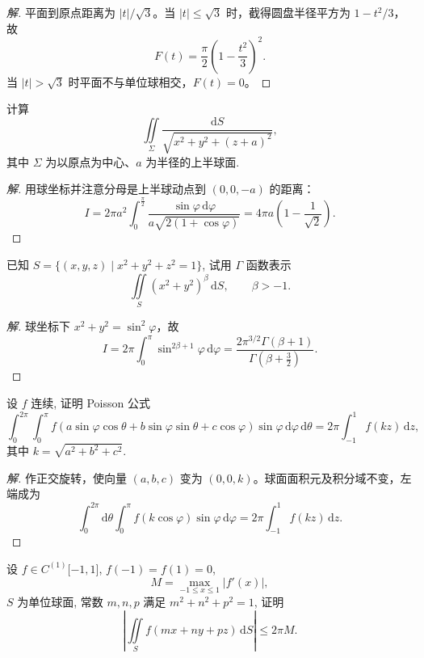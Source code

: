 \documentclass[../../数学分析培优讲义(答案版).tex]{subfiles}
\begin{document}
\begin{proof}[解]
平面到原点距离为 $|t|/\sqrt{3}$。当 $|t|\leq\sqrt{3}$ 时，截得圆盘半径平方为 $1-t^2/3$，故
\[
F(t)=\dfrac{\pi}{2}\left(1-\dfrac{t^2}{3}\right)^2.
\]
当 $|t|>\sqrt{3}$ 时平面不与单位球相交，$F(t)=0$。
\end{proof}

\begin{example}
计算
\[
    \iint\limits_\Sigma\dfrac{\mathrm{d}S}{\sqrt{x^2+y^2+(z+a)^2}},
\]
其中 $\Sigma$ 为以原点为中心、$a$ 为半径的上半球面.
\end{example}

\begin{proof}[解]
用球坐标并注意分母是上半球动点到 $(0,0,-a)$ 的距离：
\[
I=2\pi a^2\int_0^{\frac{\pi}{2}}\dfrac{\sin\varphi\,\mathrm{d}\varphi}{a\sqrt{2(1+\cos\varphi)}}
=4\pi a\left(1-\dfrac{1}{\sqrt{2}}\right).
\]
\end{proof}

\begin{example}
已知 $S=\{(x,y,z)\mid x^2+y^2+z^2=1\}$, 试用 $\Gamma$ 函数表示
\[
    \iint\limits_S(x^2+y^2)^\beta\,\mathrm{d}S,
    \qquad \beta>-1.
\]
\end{example}

\begin{proof}[解]
球坐标下 $x^2+y^2=\sin^2\varphi$，故
\[
I=2\pi\int_0^\pi\sin^{2\beta+1}\varphi\,\mathrm{d}\varphi
=\dfrac{2\pi^{3/2}\Gamma(\beta+1)}{\Gamma(\beta+\frac{3}{2})}.
\]
\end{proof}

\begin{example}
设 $f$ 连续, 证明 Poisson 公式
\[
    \int_0^{2\pi}\int_0^\pi
    f(a\sin\varphi\cos\theta+b\sin\varphi\sin\theta+c\cos\varphi)
    \sin\varphi\,\mathrm{d}\varphi\,\mathrm{d}\theta
    =2\pi\int_{-1}^1f(kz)\,\mathrm{d}z,
\]
其中 $k=\sqrt{a^2+b^2+c^2}$.
\end{example}

\begin{proof}[解]
作正交旋转，使向量 $(a,b,c)$ 变为 $(0,0,k)$。球面面积元及积分域不变，左端成为
\[
\int_0^{2\pi}\!\mathrm{d}\theta\int_0^\pi f(k\cos\varphi)\sin\varphi\,\mathrm{d}\varphi
=2\pi\int_{-1}^1f(kz)\,\mathrm{d}z.
\]
\end{proof}

\begin{example}
设 $f\in C^{(1)}\lbrack-1,1\rbrack$, $f(-1)=f(1)=0$,
\[
    M=\max_{-1\leq x\leq1}|f'(x)|,
\]
$S$ 为单位球面, 常数 $m,n,p$ 满足 $m^2+n^2+p^2=1$, 证明
\[
    \left|\iint\limits_Sf(mx+ny+pz)\,\mathrm{d}S\right|\leq2\pi M.
\]
\end{example}
\end{document}
